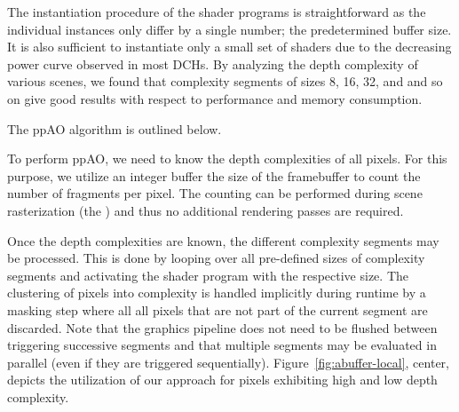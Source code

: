 \documentclass{egpubl}
\makeatletter
\newcommand{\removelatexerror}{\let\@latex@error\@gobble}
\newcommand{\dch}{DCH}
\newcommand{\stencil}{ppAO}
\makeatother
\begin{document}
The instantiation procedure of the shader programs is straightforward as the individual instances only differ by a single number; the predetermined buffer size. 
It is also sufficient to instantiate only a small set of shaders due to the decreasing power curve observed in most \dch{}s. 
By analyzing the depth complexity of various scenes, we found that complexity segments of sizes 8, 16, 32, and and so on give good results with respect to performance and memory consumption.

The \stencil{} algorithm is outlined below.
%
\begingroup
\removelatexerror%
\begin{algorithm}[H]
  \tcp{\sFill}
\end{algorithm}
\endgroup

To perform \stencil, we need to know the depth complexities of all pixels. 
For this purpose, we utilize an integer buffer the size of the framebuffer to count the number of fragments per pixel.
The counting can be performed during scene rasterization (the \sFill{}) and thus no additional rendering passes are required.

Once the depth complexities are known, the different complexity segments may be processed. 
This is done by looping over all pre-defined sizes of complexity segments and activating the shader program with the respective \bArray{} size. 
The clustering of pixels into complexity is handled implicitly during runtime by a masking step where all all pixels that are not part of the current segment are discarded. 
Note that the graphics pipeline does not need to be flushed between triggering successive segments and that multiple segments may be evaluated in parallel (even if they are triggered sequentially). 
Figure~\ref{fig:abuffer-local}, center, depicts the utilization of our approach for pixels exhibiting high and low depth complexity.
\end{document}
